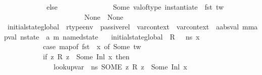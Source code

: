 \begin{isabellebody}
\ \ \ \ \ \ \ \ \ \ \ \ else\ \isanewline
\ \ \ \ \ \ \ \ \ \ \ \ \ \ Some\ {\isacharparenleft}{\kern0pt}val{\isacharunderscore}{\kern0pt}of{\isacharunderscore}{\kern0pt}type\ {\isacharparenleft}{\kern0pt}instantiate\ {\isasymOmega}\ {\isacharparenleft}{\kern0pt}fst\ tw{\isacharparenright}{\kern0pt}{\isacharparenright}{\kern0pt}{\isacharparenright}{\kern0pt}\isanewline
\ \ \ \ \ \ \ \ \ \ \ {\isacharparenright}{\kern0pt}\isanewline
\ \ \ \ \ \ \ \ \ \ {\isacharbar}{\kern0pt}\ None\ {\isasymRightarrow}\ None{\isacharparenright}{\kern0pt}{\isachardoublequoteclose}\isanewline
\isanewline
{}\isamarkupfalse%
\ initial{\isacharunderscore}{\kern0pt}state{\isacharunderscore}{\kern0pt}global\ {\isacharcolon}{\kern0pt}{\isacharcolon}{\kern0pt}\ {\isachardoublequoteopen}rtype{\isacharunderscore}{\kern0pt}env\ {\isasymRightarrow}\ passive{\isacharunderscore}{\kern0pt}rel\ {\isasymRightarrow}\ var{\isacharunderscore}{\kern0pt}context\ {\isasymRightarrow}\ var{\isacharunderscore}{\kern0pt}context\ {\isasymRightarrow}\ {\isacharparenleft}{\kern0pt}{\isacharprime}{\kern0pt}a{\isacharcolon}{\kern0pt}{\isacharcolon}{\kern0pt}absval{\isacharcomma}{\kern0pt}\ {\isacharprime}{\kern0pt}m{\isacharcolon}{\kern0pt}{\isacharcolon}{\kern0pt}mapval{\isacharparenright}{\kern0pt}\ nstate\ {\isasymRightarrow}\ {\isacharparenleft}{\kern0pt}{\isacharprime}{\kern0pt}a{\isacharcomma}{\kern0pt}\ {\isacharprime}{\kern0pt}m{\isacharparenright}{\kern0pt}\ named{\isacharunderscore}{\kern0pt}state{\isachardoublequoteclose}\isanewline
\ \ \ {\isachardoublequoteopen}initial{\isacharunderscore}{\kern0pt}state{\isacharunderscore}{\kern0pt}global\ {\isasymOmega}\ R\ {\isasymLambda}\ {\isasymLambda}{\isacharprime}{\kern0pt}\ ns\ x\ {\isacharequal}{\kern0pt}\ \isanewline
\ \ \ \ \ \ \ \ \ \ \ {\isacharparenleft}{\kern0pt}case\ {\isacharparenleft}{\kern0pt}map{\isacharunderscore}{\kern0pt}of\ {\isacharparenleft}{\kern0pt}fst\ {\isasymLambda}{\isacharprime}{\kern0pt}{\isacharparenright}{\kern0pt}\ x{\isacharparenright}{\kern0pt}\ of\ Some\ tw\ {\isacharequal}{\kern0pt}{\isachargreater}{\kern0pt}\isanewline
\ \ \ \ \ \ \ \ \ \ \ {\isacharparenleft}{\kern0pt}if\ {\isacharparenleft}{\kern0pt}{\isasymexists}z{\isachardot}{\kern0pt}\ R\ z\ {\isacharequal}{\kern0pt}\ Some\ {\isacharparenleft}{\kern0pt}Inl\ x{\isacharparenright}{\kern0pt}{\isacharparenright}{\kern0pt}\ then\ \isanewline
\ \ \ \ \ \ \ \ \ \ \ \ \ \ lookup{\isacharunderscore}{\kern0pt}var\ {\isasymLambda}\ ns\ {\isacharparenleft}{\kern0pt}SOME\ z{\isachardot}{\kern0pt}\ R\ z\ {\isacharequal}{\kern0pt}\ Some\ {\isacharparenleft}{\kern0pt}Inl\ x{\isacharparenright}{\kern0pt}{\isacharparenright}{\kern0pt}\ \isanewline

\end{isabellebody}
